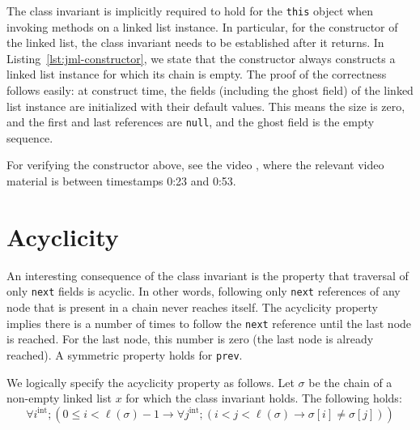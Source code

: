 \documentclass[runningheads]{llncs}
\theoremstyle{remark}
\begin{document}
\medskip



The class invariant is implicitly required to hold for the \texttt{this} object when invoking methods on a linked list instance. In particular, for the constructor of the linked list, the class invariant needs to be established after it returns. In Listing~\ref{lst:jml-constructor}, we state that the constructor always constructs a linked list instance for which its chain is empty. The proof of the correctness follows easily: at construct time, the fields (including the ghost field) of the linked list instance are initialized with their default values. This means the size is zero, and the first and last references are \texttt{null}, and the ghost field is the empty sequence.



For verifying the constructor above, see the video , where the relevant video material is between timestamps 0:23 and 0:53.

\section{Acyclicity}\label{sec:acyclicity}

An interesting consequence of the class invariant is the property that traversal of only \texttt{next} fields is acyclic. In other words, following only \texttt{next} references of any node that is present in a chain never reaches itself. The acyclicity property implies there is a number of times to follow the \texttt{next} reference until the last node is reached. For the last node, this number is zero (the last node is already reached). A symmetric property holds for \texttt{prev}.

We logically specify the acyclicity property as follows. Let $\sigma$ be the chain of a non-empty linked list $x$ for which the class invariant holds. The following holds:
$$
\forall i^\mathrm{int}; (0\leq i<\ell(\sigma)-1\to \forall j^\mathrm{int}; (i < j < \ell(\sigma)\to \sigma[i]\neq\sigma[j]))
$$
\end{document}

